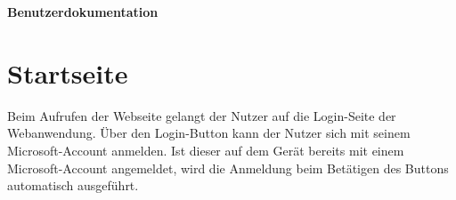 \documentclass[11pt]{article}
\begin{document}
\sloppy

\begin{titlepage}
    \color{bx-green}
    \vspace*{3cm}
        \centering
        \par
        \vspace{.5cm}
        \par
        \vspace{.5cm}
        \par
        \vspace{5cm}
        {\LARGE \textbf{Benutzerdokumentation}}
    \vspace*{\fill}   
\end{titlepage}




\tableofcontents
{}
\newpage
{}
\pagestyle{fancy}

\section{Startseite}
Beim Aufrufen der Webseite gelangt der Nutzer auf die Login-Seite der Webanwendung.
Über den Login-Button kann der Nutzer sich mit seinem Microsoft-Account anmelden. Ist dieser auf dem Gerät bereits mit einem
Microsoft-Account angemeldet, wird die Anmeldung beim Betätigen des Buttons automatisch ausgeführt.

\end{document}
